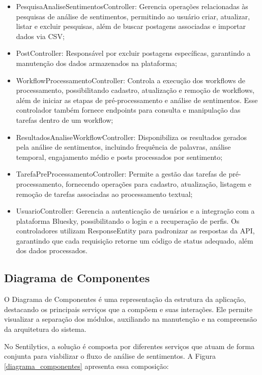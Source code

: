 \documentclass[
	12pt,				%
	oneside,			%
	a4paper,			%
	english,			%
	french,				%
	spanish,			%
	brazil				%
	]{abntex2}
\begin{document}
\begin{itemize}
\tightlist
\item
  PesquisaAnaliseSentimentosController: Gerencia operações relacionadas
  às pesquisas de análise de sentimentos, permitindo ao usuário criar,
  atualizar, listar e excluir pesquisas, além de buscar postagens
  associadas e importar dados via CSV;
\item
  PostController: Responsável por excluir postagens específicas,
  garantindo a manutenção dos dados armazenados na plataforma;
\item
  WorkflowProcessamentoController: Controla a execução dos workflows de
  processamento, possibilitando cadastro, atualização e remoção de
  workflows, além de iniciar as etapas de pré-processamento e análise de
  sentimentos. Esse controlador também fornece endpoints para consulta e
  manipulação das tarefas dentro de um workflow;
\item
  ResultadosAnaliseWorkflowController: Disponibiliza os resultados
  gerados pela análise de sentimentos, incluindo frequência de palavras,
  análise temporal, engajamento médio e posts processados por
  sentimento;
\item
  TarefaPreProcessamentoController: Permite a gestão das tarefas de
  pré-processamento, fornecendo operações para cadastro, atualização,
  listagem e remoção de tarefas associadas ao processamento textual;
\item
  UsuarioController: Gerencia a autenticação de usuários e a integração
  com a plataforma Bluesky, possibilitando o login e a recuperação de
  perfis. Os controladores utilizam ResponseEntity para padronizar as
  respostas da API, garantindo que cada requisição retorne um código de
  status adequado, além dos dados processados.
\end{itemize}

\hypertarget{diagrama-de-componentes}{%
\subsection{Diagrama de Componentes}\label{diagrama-de-componentes}}

O Diagrama de Componentes é uma representação da estrutura da aplicação,
destacando os principais serviços que a compõem e suas interações. Ele
permite visualizar a separação dos módulos, auxiliando na manutenção e
na compreensão da arquitetura do sistema.

No Sentilytics, a solução é composta por diferentes serviços que atuam
de forma conjunta para viabilizar o fluxo de análise de sentimentos. A
Figura \ref{diagrama_componentes} apresenta essa composição:
\end{document}
